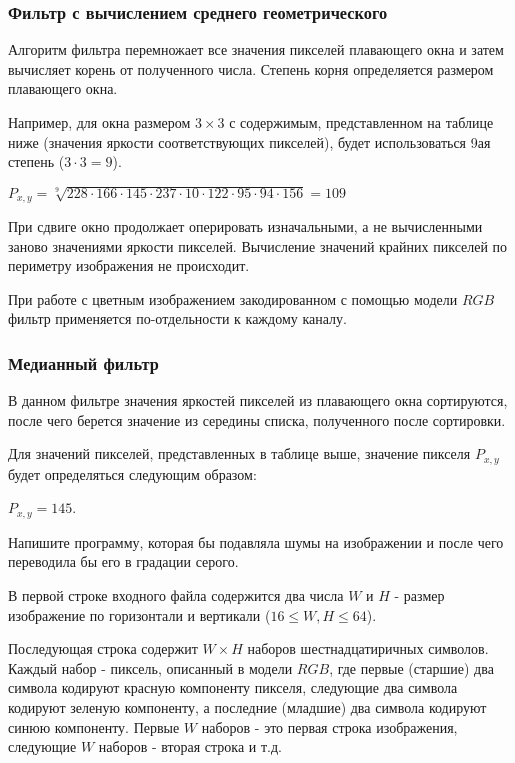 \subsubsection*{Фильтр с вычислением среднего геометрического}

Алгоритм фильтра перемножает все значения пикселей плавающего окна и затем вычисляет корень от полученного числа. Степень корня определяется размером плавающего окна.

Например, для окна размером $3 \times 3$ с содержимым, представленном на таблице ниже (значения яркости 
соответствующих пикселей), будет использоваться 9ая степень ($3\cdot3=9$).


$P_{x,y} = \sqrt[9]{228\cdot166\cdot145\cdot237\cdot10\cdot122\cdot95\cdot94\cdot156} = 109$

При сдвиге окно продолжает оперировать изначальными, а не вычисленными заново значениями яркости пикселей. Вычисление значений крайних пикселей по периметру изображения не происходит.

При работе с цветным изображением закодированном с помощью модели $RGB$ фильтр применяется по-отдельности к каждому каналу.

\subsubsection*{Медианный фильтр}

В данном фильтре значения яркостей пикселей из плавающего окна сортируются, после чего берется значение из середины списка, полученного после сортировки.

Для значений пикселей, представленных в таблице выше, значение пикселя $P_{x,y}$ будет определяться следующим образом:


$P_{x,y}=145$.

Напишите программу, которая бы подавляла шумы на изображении и после чего переводила бы его в градации серого.


В первой строке входного файла содержится два числа $W$ и $H$ - размер изображение по горизонтали и вертикали ($16 \le W, H \le 64$).

Последующая строка содержит $W \times H$ наборов шестнадцатиричных символов. Каждый набор - пиксель, описанный в модели $RGB$, где первые (старшие) два символа кодируют красную компоненту пикселя, следующие два символа кодируют зеленую компоненту, а последние (младшие) два символа кодируют синюю компоненту. Первые $W$ наборов - это первая строка изображения, следующие $W$ наборов - вторая строка и т.д.

